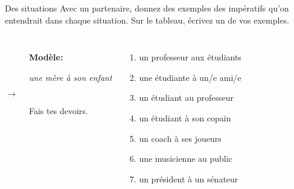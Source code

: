 \begin{frame}{Des situations }
  Avec un partenaire, donnez des exemples des impératifs qu'on entendrait dans chaque situation.
  Sur le tableau, écrivez un de vos exemples. \\
  \begin{columns}
      \begin{description}
        \item[] \textbf{Modèle:}
        \item[] \emph{une mère à son enfant}
        \item[$\to$] Fais tes devoirs.
        \item[] 
      \end{description}
      \begin{enumerate}
        \item un professeur aux étudiants
        \item une étudiante à un/e ami/e
        \item un étudiant au professeur
        \item un étudiant à son copain
        \item un coach à ses joueurs
        \item une musicienne au public
        \item un président à un sénateur
      \end{enumerate}
  \end{columns}
\end{frame}